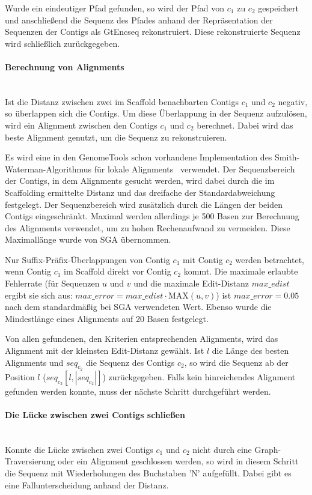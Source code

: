 \documentclass[a4paper,11pt,parskip,abstract=on]{scrartcl}
\begin{document}
Wurde ein eindeutiger Pfad gefunden, so wird der Pfad von $c_1$ zu
$c_2$ gespeichert und anschließend die Sequenz des Pfades anhand der
Repräsentation der Sequenzen der Contigs als GtEncseq rekonstruiert.
Diese rekonstruierte Sequenz wird schließlich zurückgegeben.

\paragraph{Berechnung von Alignments}~\\
Ist die Distanz zwischen zwei im Scaffold benachbarten Contigs $c_1$
und $c_2$ negativ, so überlappen sich die Contigs. Um diese
Überlappung in der Sequenz aufzulösen, wird ein Alignment zwischen den
Contigs $c_1$ und $c_2$ berechnet. Dabei wird das beste Alignment
genutzt, um die Sequenz zu rekonstruieren.

Es wird eine in den GenomeTools schon vorhandene Implementation des
Smith-Waterman-Algorithmus für lokale Alignments~\cite{smith}
verwendet. Der Sequenzbereich der Contigs, in dem Alignments gesucht
werden, wird dabei durch die im Scaffolding ermittelte Distanz und das
dreifache der Standardabweichung festgelegt. Der Sequenzbereich wird
zusätzlich durch die Längen der beiden Contigs eingeschränkt. Maximal
werden allerdings je 500 Basen zur Berechnung des Alignments
verwendet, um zu hohen Rechenaufwand zu vermeiden. Diese Maximallänge
wurde von SGA übernommen.

Nur Suffix-Präfix-Überlappungen von Contig $c_1$ mit Contig $c_2$
werden betrachtet, wenn Contig $c_1$ im Scaffold direkt vor Contig
$c_2$ kommt. Die maximale erlaubte Fehlerrate (für Sequenzen $u$ und
$v$ und die maximale Edit-Distanz $max\_edist$ ergibt sie sich aus:
$max\_error = max\_edist \cdot \text{MAX}(u,v)$) ist $max\_error =
0.05$ nach dem standardmäßig bei SGA verwendeten Wert. Ebenso wurde
die Mindestlänge eines Alignments auf 20 Basen festgelegt.

Von allen gefundenen, den Kriterien entsprechenden Alignments, wird das
Alignment mit der kleinsten Edit-Distanz gewählt. Ist $l$ die Länge
des besten Alignments und $seq_{c_2}$ die Sequenz des Contigs $c_2$,
so wird die Sequenz ab der Position $l$ ($seq_{c_2}[l,|seq_{c_2}|]$)
zurückgegeben. Falls kein hinreichendes Alignment gefunden werden
konnte, muss der nächste Schritt durchgeführt werden.

\paragraph{Die Lücke zwischen zwei Contigs schließen}~\\
Konnte die Lücke zwischen zwei Contigs $c_1$ und $c_2$ nicht durch
eine Graph-Traversierung oder ein Alignment geschlossen werden, so
wird in diesem Schritt die Sequenz mit Wiederholungen des Buchstaben
'N' aufgefüllt. Dabei gibt es eine Fallunterscheidung anhand der
Distanz.
\end{document}
